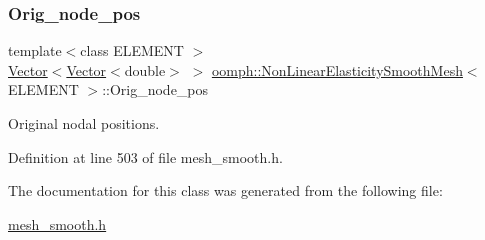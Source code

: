 \subsubsection{\texorpdfstring{Orig\+\_\+node\+\_\+pos}{Orig\_node\_pos}}
{\footnotesize\ttfamily template$<$class E\+L\+E\+M\+E\+NT $>$ \\
\hyperlink{classoomph_1_1Vector}{Vector}$<$\hyperlink{classoomph_1_1Vector}{Vector}$<$double$>$ $>$ \hyperlink{classoomph_1_1NonLinearElasticitySmoothMesh}{oomph\+::\+Non\+Linear\+Elasticity\+Smooth\+Mesh}$<$ E\+L\+E\+M\+E\+NT $>$\+::Orig\+\_\+node\+\_\+pos\hspace{0.3cm}{\ttfamily [private]}}



Original nodal positions. 



Definition at line 503 of file mesh\+\_\+smooth.\+h.



The documentation for this class was generated from the following file\+:\begin{DoxyCompactItemize}
\item 
\hyperlink{mesh__smooth_8h}{mesh\+\_\+smooth.\+h}\end{DoxyCompactItemize}
